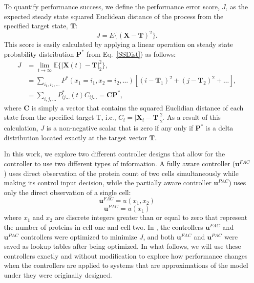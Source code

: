 \documentclass[12pt]{article}
\begin{document}
To quantify performance success, we define the performance error score, $J$, as the expected steady state squared Euclidean distance of the process from the specified target state, $\mathbf{T}$:
 \begin{equation}
 J = E\{(\mathbf{X}-\mathbf{T})^2\}.
 \end{equation}
This score is easily calculated by applying a linear operation on steady state probability distribution $\mathbf{P}^*$ from Eq.\ \ref{SSDist}) as follows:
{ \begin{align}
J&= \lim_{t\rightarrow \infty}\mathbb{E}\{|\mathbf{X}(t)-\mathbf{T}|_2^2\}, \nonumber \\ 
&=\sum_{i_1,i_2,\ldots} P^*(x_1=i_1,x_2=i_2,\ldots) \left[(i-\mathbf T_1)^2 + (j-\mathbf T_2)^2 +\ldots\right],\nonumber  \\
&=\sum_{i,j,\ldots} P^*_{ij\ldots}(t)C_{ij\ldots} =\mathbf{C}\mathbf{P}^*,
\label{Euclid}
\end{align}} where $\mathbf{C}$ is simply a vector that contains the squared Euclidian distance of each state from the specified target T, i.e., $C_i = |\mathbf{X}_i-\mathbf{T}|_2^2$. As a result of this calculation, $J$ is a non-negative scalar that is zero if any only if $\mathbf{P}^*$ is a delta distribution located exactly at the target vector $\mathbf{T}$.

In this work, we explore two different controller designs that allow for the controller to use two different types of information. A fully aware controller ($\mathbf{u}^{FAC}$) uses direct observation of the protein count of two cells simultaneously while making its control input decision, while the partially aware controller $\mathbf{u}^{PAC}$) uses only the direct observation of a single cell:
\begin{equation}
\mathbf{u}^{FAC}=u(x_1,x_2)
\end{equation}
\begin{equation}
\mathbf{u}^{PAC}=u(x_1)
\end{equation}
where $x_1$ and $x_2$ are discrete integers greater than or equal to zero that represent the number of proteins in cell one and cell two. In \cite{May2021}, the controllers $\mathbf{u}^{FAC}$ and $\mathbf{u}^{PAC}$ controllers were optimized to minimize $J$, and both $\mathbf{u}^{FAC}$ and $\mathbf{u}^{PAC}$ were saved as lookup tables after being optimized. In what follows, we will use these controllers exactly and without modification to explore how performance changes when the controllers are applied to systems that are approximations of the model under they were originally designed.
\end{document}
